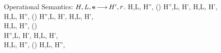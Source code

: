 \documentclass{article}
\begin{document}
\begin{display}{Operational Semantics: $H,L,\mbox{\texttt{{\upshape e}}}{\,\longrightarrow\,} H',r$.}
{H,L, \gevalsto H'', \qquad
 \istrue()\qquad
 H'',L, \levalsto H',}
{H,L, \levalsto H', }
\\[\gap]

{H,L, \gevalsto H'', \qquad
 \isfalse() \qquad
 H'',L, \levalsto H',}
{H,L, \levalsto H',}
\\[\gap]

{H,L, \gevalsto H'', \qquad
 \istrue() \\ 
 H'',L, \levalsto H',}
{H,L, \levalsto H',\und }
\\[\gap]

{H,L, \gevalsto H'', \qquad
 \isfalse()}
{H,L, \levalsto H'',\und }


\end{display}
%
\end{document}
